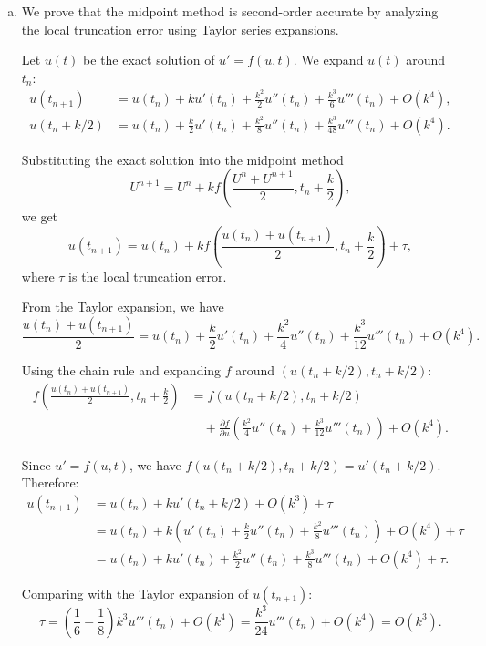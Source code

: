 \documentclass{article}
\begin{document}
\begin{enumerate}[(a)]
  \item We prove that the midpoint method is second-order accurate by analyzing the local truncation error using Taylor series expansions.

  Let $u(t)$ be the exact solution of $u' = f(u,t)$. We expand $u(t)$ around $t_n$:
  \begin{align*}
  u(t_{n+1}) &= u(t_n) + ku'(t_n) + \frac{k^2}{2}u''(t_n) + \frac{k^3}{6}u'''(t_n) + O(k^4), \\
  u(t_n + k/2) &= u(t_n) + \frac{k}{2}u'(t_n) + \frac{k^2}{8}u''(t_n) + \frac{k^3}{48}u'''(t_n) + O(k^4).
  \end{align*}

  Substituting the exact solution into the midpoint method
  \[
  U^{n+1} = U^n + k f\left( \frac{U^n + U^{n+1}}{2}, t_n + \frac{k}{2} \right),
  \]
  we get
  \[
  u(t_{n+1}) = u(t_n) + k f\left( \frac{u(t_n) + u(t_{n+1})}{2}, t_n + \frac{k}{2} \right) + \tau,
  \]
  where $\tau$ is the local truncation error. 

  From the Taylor expansion, we have
  \[
  \frac{u(t_n) + u(t_{n+1})}{2} = u(t_n) + \frac{k}{2}u'(t_n) + \frac{k^2}{4}u''(t_n) + \frac{k^3}{12}u'''(t_n) + O(k^4).
  \]

  Using the chain rule and expanding $f$ around $(u(t_n + k/2), t_n + k/2)$:
  \begin{align*}
  f\left( \frac{u(t_n) + u(t_{n+1})}{2}, t_n + \frac{k}{2} \right) &= f(u(t_n + k/2), t_n + k/2) \\
  &\quad + \frac{\partial f}{\partial u}\left(\frac{k^2}{4}u''(t_n) + \frac{k^3}{12}u'''(t_n)\right) + O(k^4).
  \end{align*}

  Since $u' = f(u,t)$, we have $f(u(t_n + k/2), t_n + k/2) = u'(t_n + k/2)$. Therefore:
  \begin{align*}
  u(t_{n+1}) &= u(t_n) + k u'(t_n + k/2) + O(k^3) + \tau \\
  &= u(t_n) + k\left(u'(t_n) + \frac{k}{2}u''(t_n) + \frac{k^2}{8}u'''(t_n)\right) + O(k^4) + \tau \\
  &= u(t_n) + ku'(t_n) + \frac{k^2}{2}u''(t_n) + \frac{k^3}{8}u'''(t_n) + O(k^4) + \tau.
  \end{align*}

  Comparing with the Taylor expansion of $u(t_{n+1})$:
  \[
  \tau = \left(\frac{1}{6} - \frac{1}{8}\right)k^3u'''(t_n) + O(k^4) = \frac{k^3}{24}u'''(t_n) + O(k^4) = O(k^3).
  \]


\end{enumerate}
\end{document}

